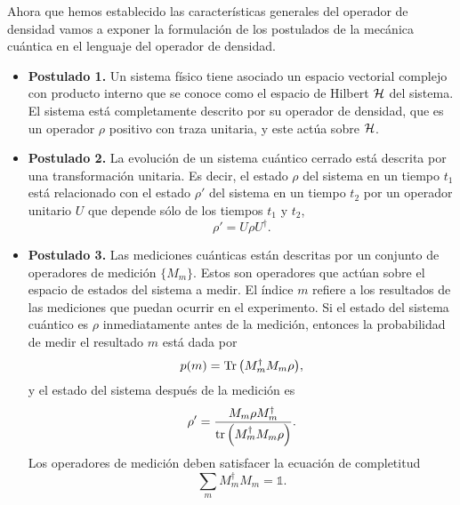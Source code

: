 Ahora que hemos establecido las características generales del 
operador de densidad vamos a exponer la formulación
de  los postulados de la mecánica cuántica en el lenguaje del 
operador de densidad.
\begin{itemize}
	\item[] \textbf{Postulado 1.} Un sistema físico tiene asociado un espacio vectorial complejo
	con producto interno que se conoce como el espacio de Hilbert $\mathcal{H}$ del
	sistema. El sistema está completamente descrito por su operador de densidad,
	que es un operador $\rho$ positivo con traza unitaria, y este actúa sobre 
	$\mathcal{H}$. 
	\item[] \textbf{Postulado 2.} La evolución de un sistema cuántico cerrado está descrita por una transformación
	unitaria. Es decir, el estado $\rho$ del sistema en un tiempo $t_1$ está 
	relacionado con el estado $\rho'$ del sistema en un tiempo $t_2$ por un operador
	unitario $U$ que depende sólo de los tiempos $t_1$ y $t_2$,
	\begin{equation}
	\rho'=U\rho U^{\dagger}.
	\label{eq:postulate1}
	\end{equation}
	\item[] \textbf{Postulado 3.} Las mediciones cuánticas están descritas
por un conjunto de 
	operadores de medición $\{M_m\}$. Estos son operadores que actúan sobre el espacio 
	de estados del sistema a medir. El índice $m$ refiere a los resultados
	de las mediciones que puedan ocurrir en el experimento. Si el estado del sistema
	cuántico es $\rho$ inmediatamente antes de la medición, entonces la probabilidad
	de medir el resultado $m$ está dada por
	\begin{equation}
	p(m)=\Tr \qty(M_m^{\dagger}M_m\rho),
	\label{eq:postulate2_prob}
	\end{equation}						
	y el estado del sistema después de la medición es
	\begin{equation}
	\rho'=\frac{M_m\rho M_m^{\dagger}}{\tr \qty(M_m^{\dagger}M_m\rho)}.
	\label{eq:postulate2_rhoPrime}
	\end{equation}	
	Los operadores de medición deben satisfacer la ecuación de completitud
	\begin{equation}
	\sum _m M_m^{\dagger}M_m=\mathbb{1}.
	\label{eq:postulate2_completeness}
	\end{equation}

\end{itemize}
